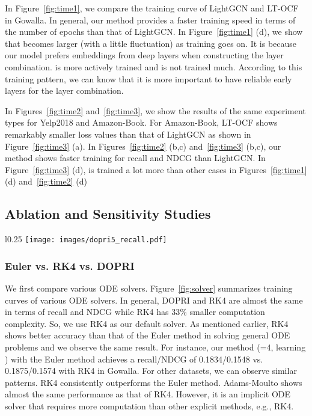 \documentclass[sigconf]{acmart}
\begin{document}
In Figure~\ref{fig:time1}, we compare the training curve of LightGCN and LT-OCF in Gowalla. In general, our method provides a faster training speed in terms of the number of epochs than that of LightGCN. In Figure~\ref{fig:time1} (d), we show that  becomes larger (with a little fluctuation) as training goes on. It is because our model prefers embeddings from deep layers when constructing the layer combination.  is more actively trained and  is not trained much. According to this training pattern, we can know that it is more important to have reliable early layers for the layer combination.

In Figures~\ref{fig:time2} and~\ref{fig:time3}, we show the results of the same experiment types for Yelp2018 and Amazon-Book. For Amazon-Book, LT-OCF shows remarkably smaller loss values than that of LightGCN as shown in Figure~\ref{fig:time3} (a). In Figures~\ref{fig:time2} (b,c) and~\ref{fig:time3} (b,c), our method shows faster training for recall and NDCG than LightGCN. In Figure~\ref{fig:time3} (d),  is trained a lot more than other cases in Figures~\ref{fig:time1} (d) and~\ref{fig:time2} (d)

\subsection{Ablation and Sensitivity Studies}
\begin{wrapfigure}{l}{0.25\textwidth}
\vspace{-1em}
    \centering
    \texttt{[image: images/dopri5\_recall.pdf]}
    \caption{Various ODE solvers}
    \label{fig:solver}
\end{wrapfigure}

\subsubsection{Euler vs. RK4 vs. DOPRI} We first compare various ODE solvers. Figure~\ref{fig:solver} summarizes training curves of various ODE solvers. In general, DOPRI and RK4 are almost the same in terms of recall and NDCG while RK4 has 33\% smaller computation complexity. So, we use RK4 as our default solver. As mentioned earlier, RK4 shows better accuracy than that of the Euler method in solving general ODE problems and we observe the same result. For instance, our method (=4, learning ) with the Euler method achieves a recall/NDCG of 0.1834/0.1548 vs. 0.1875/0.1574 with RK4 in Gowalla. For other datasets, we can observe similar patterns. RK4 consistently outperforms the Euler method. Adams-Moulto shows almost the same performance as that of RK4. However, it is an implicit ODE solver that requires more computation than other explicit methods, e.g., RK4.
\end{document}
